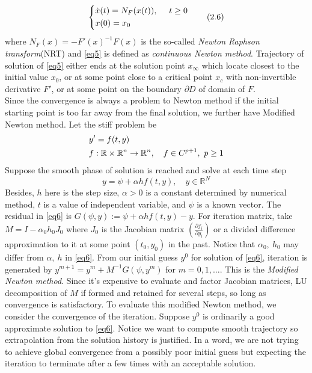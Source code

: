 \documentclass[
11pt, %
a4paper, %
oneside, %
headinclude,footinclude, %
BCOR5mm, %
]{scrartcl}
\begin{document}
\begin{equation}
\label{eq5}
\centering
\left\{\begin{split}
&\dot{x}(t)=N_F(x(t)),\ \ \ \ t\geq 0\\
&x(0)=x_0
\end{split}\right.\tag{2.6}
 \end{equation}
where $N_F(x)=-F'(x)^{-1}F(x)$ is the so-called \textit{Newton Raphson transform}(NRT) and \vref{eq5} is defined as \textit{continuous Newton method}. Trajectory of solution of \vref{eq5} either ends at the solution point $x_\infty$ which locate closest to the initial value $x_0$, or at some point close to a critical point $x_c$ with non-invertible derivative $F'$, or at some point on the boundary $\partial D$ of domain of $F$. 
\vspace{0.6em}\\Since the convergence is always a problem to Newton method if the initial starting point is too far away from the final solution, we further have Modified Newton method. Let the stiff problem be 
\begin{align}
    &y'=f(t,y)\notag \\
    &f:\mathbb{R} \times \mathbb{R}^n\rightarrow \mathbb{R}^n, \quad f\in C^{p+1}, \ p\geq 1 \notag 
\end{align}
Suppose the smooth phase of solution is reached and solve at each time step
\begin{equation}
    \label{eq6}
    y=\psi+\alpha hf(t,y), \quad y\in \mathbb{R}^N\tag{2.7}
\end{equation}
Besides, $h$ here is the step size, $\alpha>0$ is a constant determined by numerical method, $t$ is a value of independent variable, and $\psi$ is a known vector. The residual in \vref{eq6} is $G(\psi,y):=\psi+\alpha hf(t,y)-y$. For iteration matrix, take $M=I-\alpha_0h_0J_0$ where $J_0$ is the Jacobian matrix $\left(\frac{\partial f_i}{\partial y_i}\right)$ or a divided difference approximation to it at some point $(t_0,y_0)$ in the past. Notice that $\alpha_0, \ h_0$ may differ from $\alpha,\ h$ in \vref{eq6}. From our initial guess $y^0$ for solution of \vref{eq6}, iteration is generated by  $y^{m+1}=y^m+M^{-1}G(\psi, y^m)$ for $m=0,1,\dots$. This is the \textit{Modified Newton method}. Since it's expensive to evaluate and factor Jacobian matrices, LU decomposition of $M$ if formed and retained for several steps, so long as convergence is satisfactory. To evaluate this modified Newton method, we consider the convergence of the iteration. Suppose $y^0$ is ordinarily a good approximate solution to \vref{eq6}. Notice we want to compute smooth trajectory so extrapolation from the solution history is justified. In a word, we are not trying to achieve global convergence from a possibly poor initial guess but expecting the iteration to terminate after a few times with an acceptable solution. 
\end{document}
